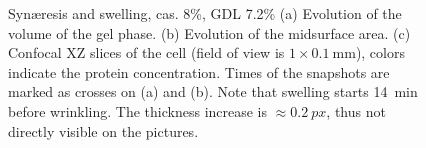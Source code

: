 \documentclass[10pt,a4paper,twocolumn]{article}
\begin{document}
\begin{figure}
\begin{tikzpicture}
	\end{tikzpicture}
	\caption{Synæresis and swelling, cas. 8\%, GDL 7.2\% (a) Evolution of the volume of the gel phase. (b) Evolution of the midsurface area. (c) Confocal XZ slices of the cell (field of view is $1\times\SI{0.1}{\milli\metre}$), colors indicate the protein concentration. Times of the snapshots are marked as crosses on (a) and (b). Note that swelling starts \SI{14}{\minute} before wrinkling. The thickness increase is $\approx\SI{0.2}{px}$, thus not directly visible on the pictures.}
	\label{fig:wrinkles}
\end{figure}
\end{document}
